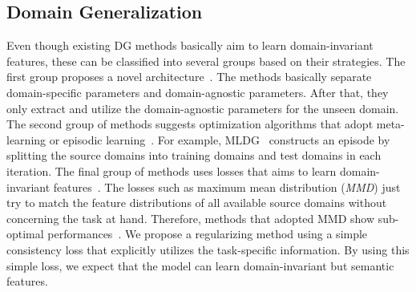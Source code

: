 \subsection{Domain Generalization}
Even though existing DG methods basically aim to learn domain-invariant features, these can be classified into several groups based on their strategies. The first group proposes a novel architecture~\cite{Khosla12undobias, Li2017dg}. The methods basically separate domain-specific parameters and domain-agnostic parameters. After that, they only extract and utilize the domain-agnostic parameters for the unseen domain. The second group of methods suggests optimization algorithms that adopt meta-learning or episodic learning~\cite{li2019episodic, Li2018MLDG, NIPS2018_metareg}. For example, MLDG~\cite{Li2018MLDG} constructs an episode by splitting the source domains into training domains and test domains in each iteration. The final group of methods uses losses that aims to learn domain-invariant features~\cite{Ghifary2015mtae, muandet2013domaingeneralization, mmdaaecvpr2018}. The losses such as maximum mean distribution (\textit{MMD}) just try to match the feature distributions of all available source domains without concerning the task at hand. Therefore, methods that adopted MMD show sub-optimal performances~\cite{Saito2018, Saito2018b}. We propose a regularizing method using a simple consistency loss that explicitly utilizes the task-specific information. By using this simple loss, we expect that the model can learn domain-invariant but semantic features.